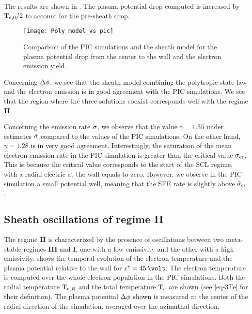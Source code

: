     The results are shown in .
    The plasma potential drop computed is increased by $\mathrm{T_{e, 0}}/2$ to account for the pre-sheath drop.


    \begin{figure}[hbt]
      \centering
      \texttt{[image: Poly\_model\_vs\_pic]}
      \caption{Comparison of the PIC simulations and the sheath model for the plasma potential drop from the center to the wall and the electron emission yield. }
      \label{fig-Poly_model_vs_pic}
    \end{figure}

    Concerning $\Delta \phi$, we see that the sheath model combining the polytropic state law and the electron emission is in good agreement with the \ac{PIC} simulations.
    We see that the region where the three solutions coexist corresponds well with the regime {\bf II}.

    Concerning the emission rate $ \bar{\sigma }$, we observe that the value $\gamma=1.35$ under estimates $ \bar{\sigma }$ compared to the values of the \ac{PIC} simulations.
    On the other hand, $\gamma=1.28$ is in very good agreement.
    Interestingly, the saturation of the mean electron emission rate in the \ac{PIC} simulation is greater than the critical value $ \bar{\sigma }_{\rm cr}$.
    This is because the critical value corresponds to the start of the \ac{SCL} regime, with a radial electric at the wall equals to zero.
    However, we observe in the \ac{PIC} simulation a small potential well, meaning that the \ac{SEE} rate is slightly above $ \bar{\sigma }_{\rm cr}$.
    
    
  \subsection{Sheath oscillations of regime {\bf II}} \label{subsec-pic_scheath_RSO}
  
    The regime {\bf II} is characterized by the presence of oscillations between two meta-stable regimes {\bf III} and {\bf I}, one with a low emissivity and the other with a high emissivity.
     shows the temporal evolution of the electron temperature and the plasma potential relative to the wall for $\crover=45\,\volt$.
    The electron temperature is computed over the whole electron population in the \ac{PIC} simulations.
    Both the radial temperature $\mathrm{T_e}_{,R}$ and the total temperature $\mathrm{T_e}$ are shown (see \cref{eq-3Te} for their definition).
    The plasma potential $\Delta \phi$ shown is measured at the center of the radial direction of the simulation, averaged over the azimuthal direction.
    
